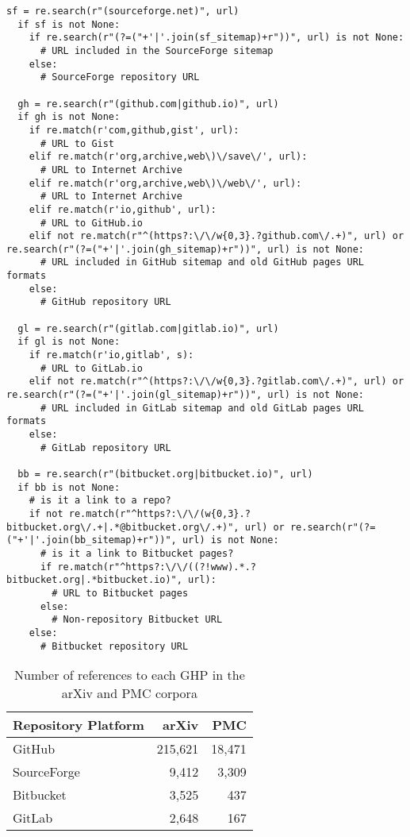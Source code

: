 \begin{lstlisting}[caption={Regular expressions to sort URLs to repositories in GitHub, GitLab, SourceForge, and Bitbucket from all other URLs}, label={lst:regex}]
  sf = re.search(r"(sourceforge.net)", url)
  if sf is not None:
    if re.search(r"(?=("+'|'.join(sf_sitemap)+r"))", url) is not None:
      # URL included in the SourceForge sitemap
    else:
      # SourceForge repository URL

  gh = re.search(r"(github.com|github.io)", url)
  if gh is not None:
    if re.match(r'com,github,gist', url):
      # URL to Gist
    elif re.match(r'org,archive,web\)\/save\/', url):
      # URL to Internet Archive
    elif re.match(r'org,archive,web\)\/web\/', url):
      # URL to Internet Archive
    elif re.match(r'io,github', url):
      # URL to GitHub.io
    elif not re.match(r"^(https?:\/\/w{0,3}.?github.com\/.+)", url) or re.search(r"(?=("+'|'.join(gh_sitemap)+r"))", url) is not None:
      # URL included in GitHub sitemap and old GitHub pages URL formats
    else:
      # GitHub repository URL
  
  gl = re.search(r"(gitlab.com|gitlab.io)", url)
  if gl is not None:
    if re.match(r'io,gitlab', s):
      # URL to GitLab.io 
    elif not re.match(r"^(https?:\/\/w{0,3}.?gitlab.com\/.+)", url) or re.search(r"(?=("+'|'.join(gl_sitemap)+r"))", url) is not None:
      # URL included in GitLab sitemap and old GitLab pages URL formats
    else:
      # GitLab repository URL
  
  bb = re.search(r"(bitbucket.org|bitbucket.io)", url)
  if bb is not None:
    # is it a link to a repo?
    if not re.match(r"^https?:\/\/(w{0,3}.?bitbucket.org\/.+|.*@bitbucket.org\/.+)", url) or re.search(r"(?=("+'|'.join(bb_sitemap)+r"))", url) is not None:
      # is it a link to Bitbucket pages?
      if re.match(r"^https?:\/\/((?!www).*.?bitbucket.org|.*bitbucket.io)", url):
        # URL to Bitbucket pages
      else:
        # Non-repository Bitbucket URL
    else:
      # Bitbucket repository URL
\end{lstlisting}

\begin{table}
    \centering
    \begin{tabular}{|l|r|r|}
    \hline
    Repository Platform & arXiv & PMC\\
    \hline
    GitHub & 215,621 & 18,471\\
    SourceForge & 9,412 & 3,309\\
    Bitbucket & 3,525 & 437\\
    GitLab & 2,648 & 167\\
  \hline
    \end{tabular}
    \caption{Number of references to each GHP in the arXiv and PMC corpora}
    \label{tab:repo_count}
\end{table}

